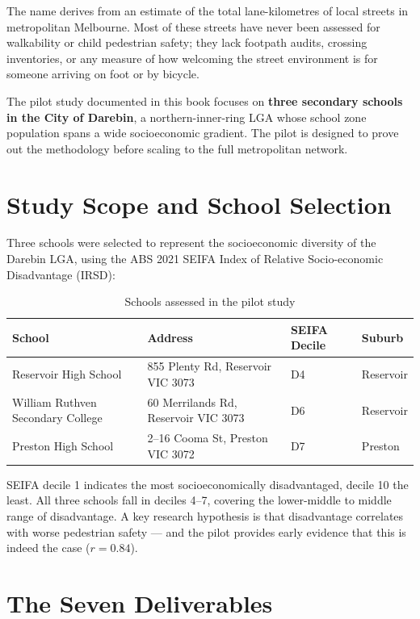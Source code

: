 \documentclass[11pt,a4paper,openany]{book}
\begin{document}
The name derives from an estimate of the total lane-kilometres of local streets in metropolitan Melbourne. Most of these streets have never been assessed for walkability or child pedestrian safety; they lack footpath audits, crossing inventories, or any measure of how welcoming the street environment is for someone arriving on foot or by bicycle.

The pilot study documented in this book focuses on \textbf{three secondary schools in the City of Darebin}, a northern-inner-ring LGA whose school zone population spans a wide socioeconomic gradient. The pilot is designed to prove out the methodology before scaling to the full metropolitan network.

\section{Study Scope and School Selection}

Three schools were selected to represent the socioeconomic diversity of the Darebin LGA, using the ABS 2021 SEIFA Index of Relative Socio-economic Disadvantage (IRSD):

\begin{table}[H]
\centering
\caption{Schools assessed in the pilot study}
\begin{tabular}{L{3.8cm}L{5cm}C{2cm}C{2cm}}
\toprule
\textbf{School} & \textbf{Address} & \textbf{SEIFA Decile} & \textbf{Suburb} \\
\midrule
Reservoir High School & 855 Plenty Rd, Reservoir VIC 3073 & D4 & Reservoir \\
William Ruthven Secondary College & 60 Merrilands Rd, Reservoir VIC 3073 & D6 & Reservoir \\
Preston High School & 2--16 Cooma St, Preston VIC 3072 & D7 & Preston \\
\bottomrule
\end{tabular}
\end{table}

SEIFA decile 1 indicates the most socioeconomically disadvantaged, decile 10 the least. All three schools fall in deciles 4--7, covering the lower-middle to middle range of disadvantage. A key research hypothesis is that disadvantage correlates with worse pedestrian safety --- and the pilot provides early evidence that this is indeed the case (\(r = 0.84\)).

\section{The Seven Deliverables}
\end{document}

